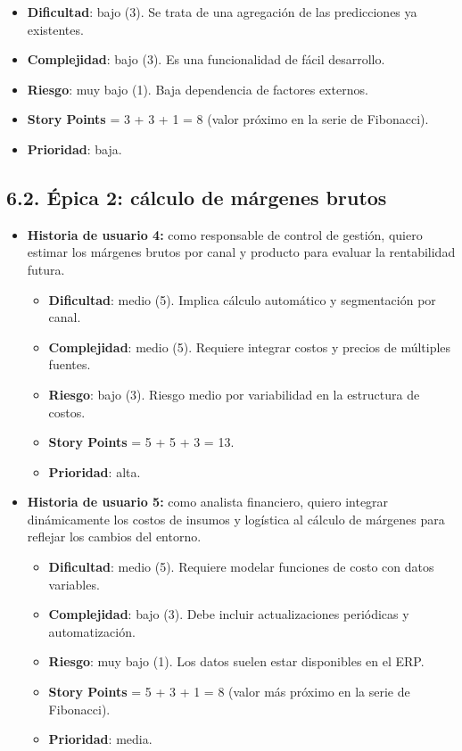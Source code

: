 \documentclass[
11pt, %
]{charter}
\begin{document}
\begin{itemize}
    \begin{itemize}
      \item \textbf{Dificultad}: bajo (3). Se trata de una agregación de las predicciones ya existentes.
      \item \textbf{Complejidad}: bajo (3). Es una funcionalidad de fácil desarrollo.
      \item \textbf{Riesgo}: muy bajo (1). Baja dependencia de factores externos.
      \item \textbf{Story Points} = 3 + 3 + 1 = 8 (valor próximo en la serie de Fibonacci).
      \item \textbf{Prioridad}: baja.
    \end{itemize}
\end{itemize}

\subsection*{6.2. Épica 2: cálculo de márgenes brutos}
\begin{itemize}
  \item \textbf{Historia de usuario 4:} como responsable de control de gestión, quiero estimar los márgenes brutos por canal y producto para evaluar la rentabilidad futura.
    \begin{itemize}
      \item \textbf{Dificultad}: medio (5). Implica cálculo automático y segmentación por canal.
      \item \textbf{Complejidad}: medio (5). Requiere integrar costos y precios de múltiples fuentes.
      \item \textbf{Riesgo}: bajo (3). Riesgo medio por variabilidad en la estructura de costos.
      \item \textbf{Story Points} = 5 + 5 + 3 = 13.
      \item \textbf{Prioridad}: alta.
    \end{itemize}
  \item \textbf{Historia de usuario 5:} como analista financiero, quiero integrar dinámicamente los costos de insumos y logística al cálculo de márgenes para reflejar los cambios del entorno.
    \begin{itemize}
      \item \textbf{Dificultad}: medio (5). Requiere modelar funciones de costo con datos variables.
      \item \textbf{Complejidad}: bajo (3). Debe incluir actualizaciones periódicas y automatización.
      \item \textbf{Riesgo}: muy bajo (1). Los datos suelen estar disponibles en el ERP.
      \item \textbf{Story Points} = 5 + 3 + 1 = 8 (valor más próximo en la serie de Fibonacci).
      \item \textbf{Prioridad}: media.
    \end{itemize}
\end{itemize}
\end{document}
